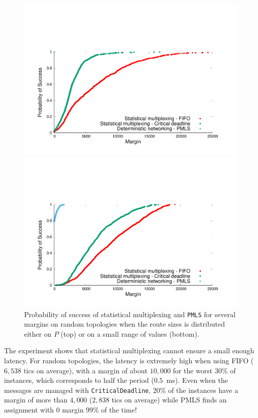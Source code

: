 \documentclass[a4paper,10pt]{journal}
\newcommand\PMLS{\texttt{PMLS}\xspace}
\newcommand\critdead{\texttt{CriticalDeadline}\xspace}
\begin{document}
    \begin{figure}


       \begin{center}
      \includegraphics[width = 0.9\linewidth]{stochasticdistrib.pdf}


     \includegraphics[width = 0.9\linewidth]{stochastic.pdf}

       \end{center}

      
      
  \caption{Probability of success of statistical multiplexing and \PMLS for several margins on random topologies when the route sizes is distributed either on $P$ (top) or on a small range of values (bottom).}
      \label{fig:sto} 
      \end{figure}

  
   The experiment shows that statistical multiplexing cannot ensure a small enough latency. 
    For random topologies, the latency is extremely high when using FIFO ($6,538$ tics on average), with a margin of about $10,000$ for the worst $30\%$ of instances, which corresponds to half the period ($0.5$~ms). Even when the messages are managed with \critdead, $20\%$ of the instances have a margin of more than $4,000$ ($2,838$ tics on average) while PMLS finds an assignment with $0$ margin $99\%$ of the time! 
    
\end{document}
